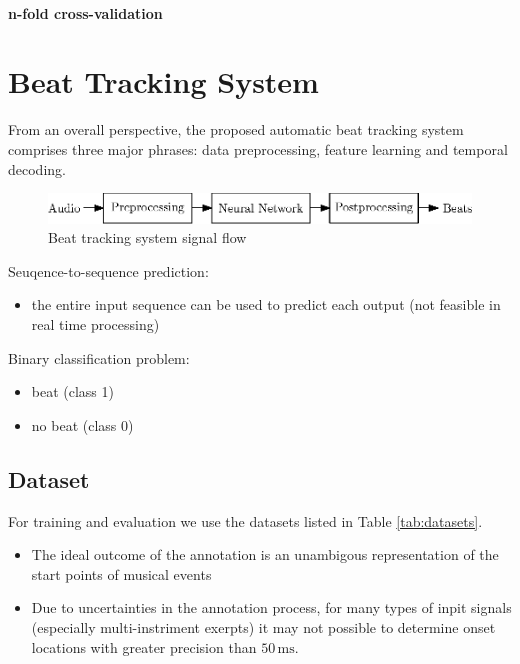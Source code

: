 \documentclass{scrartcl}
\begin{document}
\paragraph{n-fold cross-validation} 




\newpage
\section{Beat Tracking System}

From an overall perspective, the proposed automatic beat tracking system comprises three major phrases: data preprocessing, feature learning and temporal decoding. 

\begin{figure}[htbp]
\centering
\includegraphics[scale=1.0]{figures/beat_tracking_system.eps}
\caption{Beat tracking system signal flow}
\label{fig:}
\end{figure}  


Seuqence-to-sequence prediction:
\begin{itemize}
\item the entire input sequence can be used to predict each output (not feasible in real time processing)
\end{itemize}

Binary classification problem:
\begin{itemize}
\item beat (class 1)
\item no beat (class 0)
\end{itemize}



\subsection{Dataset}
For training and evaluation we use the datasets listed in Table \ref{tab:datasets}.

\begin{itemize}
\item The ideal outcome of the annotation is an unambigous representation of the start points of musical events
\item Due to uncertainties in the annotation process, for many types of inpit signals (especially multi-instriment exerpts) it may not possible to determine onset locations with greater precision than $50\,\text{ms}$. \cite{Leveau2004}
\end{itemize}
\end{document}
